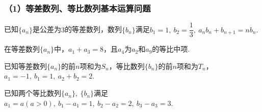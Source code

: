 \documentclass{BHCexam}
\begin{document}
\subsubsection*{（1）等差数列、等比数列基本运算问题}
\begin{questions}
\qs 已知$\{a_n\}$是公差为$3$的等差数列，数列$\{b_n\}$满足$ b_1=1,~b_2=\dfrac13,~a_nb_n+b_{n+1}=nb_n.$
\kongbai

\qs 在等差数列$\{a_n\}$中，$a_1+a_3=8$，且$a_4$为$a_2$和$a_9$的等比中项.
\kongbai

\qs 已知等差数列$\{a_n\}$的前$n$项和为$S_n$，等比数列$\{b_n\}$的前$n$项和为$T_n$，$a_1=-1,~b_1=1,~a_2+b_2=2$.
\kongbai

\qs 已知两个等比数列$\{a_n\},~\{b_n\}$满足$a_1=a(a>0),~b_1-a_1=1,~b_2-a_2=2,~b_3-a_3=3$.
\kongbai


\end{questions}
\end{document}
